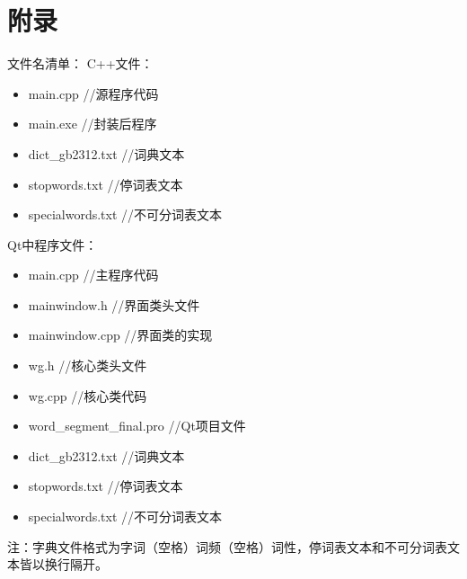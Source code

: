 \documentclass[UTF8]{ctexart}
\begin{document}
\section{附录}
文件名清单：
C++文件：
\begin{itemize}
\item main.cpp //源程序代码
\item main.exe //封装后程序
\item dict\_gb2312.txt //词典文本
\item stopwords.txt //停词表文本
\item specialwords.txt //不可分词表文本
\end{itemize}\par
Qt中程序文件：
\begin{itemize}
\item main.cpp //主程序代码
\item mainwindow.h //界面类头文件
\item mainwindow.cpp //界面类的实现
\item wg.h //核心类头文件
\item wg.cpp //核心类代码
\item word\_segment\_final.pro //Qt项目文件
\item dict\_gb2312.txt //词典文本
\item stopwords.txt //停词表文本
\item specialwords.txt //不可分词表文本
\end{itemize}\par
注：字典文件格式为字词（空格）词频（空格）词性，停词表文本和不可分词表文本皆以换行隔开。
\end{document}
